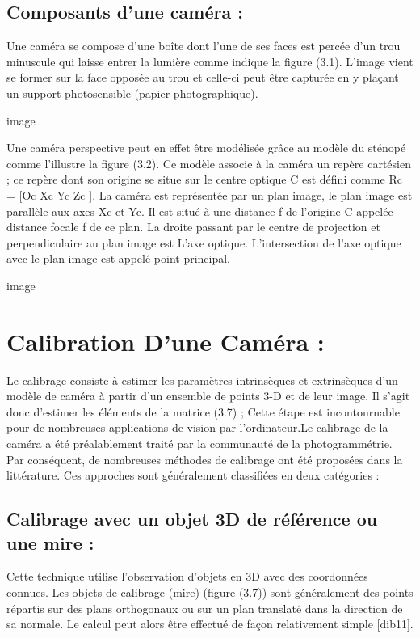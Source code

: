\subsection{ Composants d'une caméra :}
Une caméra se compose d'une boîte dont l'une de ses faces est percée d'un trou minuscule 
qui laisse entrer la lumière comme indique la figure (3.1). 
L'image vient se former sur la face opposée au trou et celle-ci peut être capturée en y 
plaçant un support photosensible (papier photographique).

image 

Une caméra perspective peut en effet être modélisée grâce au modèle du sténopé comme 
l'illustre la figure (3.2). Ce modèle associe à la caméra un repère cartésien ; ce repère dont son 
origine se situe sur le centre optique C est défini comme Rc = [Oc Xc Yc Zc ]. La caméra est 
représentée par un plan image, le plan image est parallèle aux axes Xc et Yc. Il est situé à une 
distance f de l'origine C appelée distance focale f de ce plan. La droite passant par le centre 
de projection et perpendiculaire au plan image est L'axe optique. L'intersection de l'axe 
optique avec le plan image est appelé point principal.

image

\section{Calibration D'une Caméra :}
Le calibrage consiste à estimer les paramètres intrinsèques et extrinsèques d'un modèle de 
caméra à partir d'un ensemble de points 3-D et de leur image. Il s'agit donc d'estimer les 
éléments de la matrice (3.7) ; Cette étape est incontournable pour de nombreuses applications 
de vision par l’ordinateur.Le calibrage de la caméra a été préalablement traité par la communauté de la 
photogrammétrie. Par conséquent, de nombreuses méthodes de calibrage ont été proposées
dans la littérature. Ces approches sont généralement classifiées en deux catégories :
\subsection{Calibrage avec un objet 3D de référence ou une mire :}
Cette technique utilise l’observation d’objets en 3D avec des coordonnées connues. Les 
objets de calibrage (mire) (figure (3.7)) sont généralement des points répartis sur des plans 
orthogonaux ou sur un plan translaté dans la direction de sa normale. Le calcul peut alors être 
effectué de façon relativement simple [dib11].
